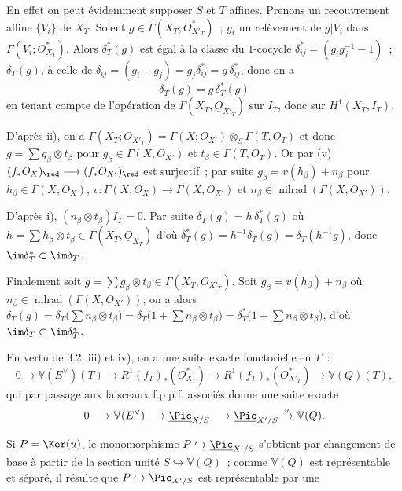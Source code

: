 

En
effet on peut évidemment supposer \(S\) et \(T\) affines. Prenons un recouvrement affine \(\{V_i\}\) de \(X_T\). Soient \(g\in\Gamma(X_T;{O}_{X'_T}^{*})\)~; \(g_i\) un relèvement de \(g|V_i\) dans \(\Gamma(V_i;{O}_{X_T}^{*})\). Alors \(\delta_T^*(g)\) est égal à la classe du \(1\)-cocycle \(\delta_{ij}^*=(g_ig_j^{-1}-1)\)~; \(\delta_T(g)\), à celle de \(\delta_{ij}=(g_i-g_j)=g_j\delta_{ij}^*=g\,\delta_{ij}^*\), donc on a
\[
  \delta_T(g)=g\,\delta_T^*(g)
\]
en tenant compte de l'opération de \(\Gamma(X_T,\underline{O}_{X'_T})\) sur \(I_T\), donc sur \(H^1(X_T,I_T)\).

D'après ii), on a \(\Gamma(X_T;{O}_{X'_T})=\Gamma(X;{O}_{X'})\otimes_S\Gamma(T,{O}_T)\) et donc \(g=\sum g_\beta\otimes t_\beta\) pour
\(g_\beta\in\Gamma(X,{O}_{X'})\) et
\(t_\beta\in\Gamma(T,{O}_T)\). Or par (v) \((f_*{O}_X)_{\red}\longrightarrow(f_*{O}_{X'})_{\red}\) est surjectif~; par suite \(g_\beta=v(h_\beta)+n_\beta\) pour
\(h_\beta\in\Gamma(X;{O}_X)\), \(v:\Gamma(X,{O}_X)\to
\Gamma(X,{O}_{X'})\) et
\(n_\beta\in\operatorname{nilrad}(\Gamma(X,{O}_{X'}))\).

D'après i),
\((n_\beta\otimes t_\beta)I_T=0\). Par suite \(\delta_T(g)=h\,\delta_T^*(g)\) où \(h=\sum h_\beta\otimes t_\beta\in\Gamma(X_T,\underline{O}_{X_T})\) d'où \(\delta_T^*(g)=h^{-1}\delta_T(g)=\delta_T(h^{-1}g)\), donc \(\im\delta_T^*\subset\im\delta_T\).

Finalement soit \(g=\sum g_\beta\otimes t_\beta\in
\Gamma(X_T,{O}_{X'_T})\). Soit \(g_\beta=v(h_\beta)+n_\beta\) où
\(n_\beta\in\operatorname{nilrad}(\Gamma(X,{O}_{X'}))\); on a alors \(\delta_T(g)=\delta_T\bigl(\sum n_\beta\otimes t_\beta\bigr)=\delta_T\bigl(1+\sum n_\beta\otimes t_\beta\bigr)=\delta_T^*\bigl(1+\sum n_\beta\otimes t_\beta\bigr)\), d'où \(\im\delta_T\subset\im\delta_T^*\).

En vertu de 3.2, iii) et iv), on a une suite exacte fonctorielle en \(T\)~:
\[
  0\longrightarrow \mathbb V(E^\vee)(T)\longrightarrow
  R^1(f_T)_*({O}_{X_T}^{*})
  \longrightarrow
  R^1(f_T)_*({O}_{X'_T}^{*}) \longrightarrow \mathbb V(Q)(T),
\]
qui par passage aux faisceaux f.p.p.f. associés donne une suite exacte
\[
  0\longrightarrow \mathbb V(E^\vee)\longrightarrow\underline{\Pic}_{X/S}
  \longrightarrow\underline{\Pic}_{X'/S}\xrightarrow{u}\mathbb V(Q).
\]

Si \(P=\Ker(u)\), le monomorphisme \(P\hookrightarrow\underline{\Pic}_{X'/S}\) s'obtient par changement de base à partir de la section unité \(S\hookrightarrow\mathbb V(Q)\)~; comme \(\mathbb V(Q)\) est représentable et séparé, il résulte que \(P\hookrightarrow\Pic_{X'/S}\) est représentable par une
